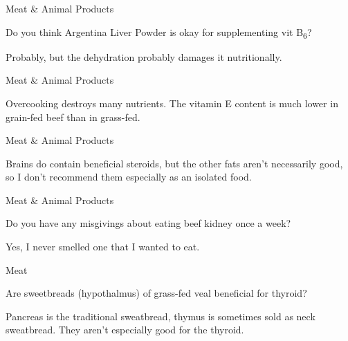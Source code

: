 \documentclass[11pt,oneside,openany,extrafontsizes]{memoir}
\begin{document}
\begin{qaexchange}{Meat \& Animal Products}

    \begin{question}
        Do you think Argentina Liver Powder is okay for supplementing vit B\textsubscript{6}?
    \end{question}

    \begin{answer}
        Probably, but the dehydration probably damages it nutritionally.
    \end{answer}
\end{qaexchange}

\begin{standalonequote}{Meat \& Animal Products}

    \begin{answer}
        Overcooking destroys many nutrients. The vitamin E content is much lower in grain-fed beef than in grass-fed.
    \end{answer}
\end{standalonequote}

\begin{standalonequote}{Meat \& Animal Products}

    \begin{answer}
        Brains do contain beneficial steroids, but the other fats aren't necessarily good, so I don't recommend them especially as an isolated food.
    \end{answer}
\end{standalonequote}

\begin{qaexchange}{Meat \& Animal Products}

    \begin{question}
        Do you have any misgivings about eating beef kidney once a week?
    \end{question}

    \begin{answer}
        Yes, I never smelled one that I wanted to eat.
    \end{answer}
\end{qaexchange}

\begin{qaexchange}{Meat}

    \begin{question}
        Are sweetbreads (hypothalmus) of grass-fed veal beneficial for thyroid?
    \end{question}

    \begin{answer}
        Pancreas is the traditional sweatbread, thymus is sometimes sold as neck sweatbread. They aren't especially good for the thyroid.
    \end{answer}
\end{qaexchange}
\end{document}
